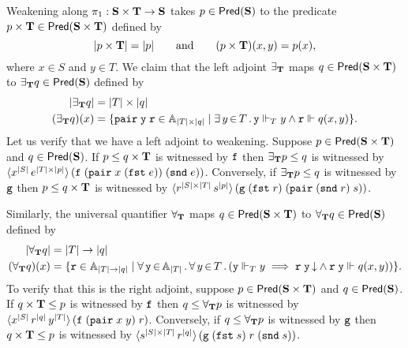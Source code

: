 Weakening along $\pi_1 : \mathbf{S} \times \mathbf{T} \to \mathbf{S}$ takes $p
\in \mathsf{Pred}(\mathbf{S})$ to the predicate $p \times \mathbf{T} \in
\mathsf{Pred}(\mathbf{S} \times \mathbf{T})$ defined by
%
\begin{equation*}
  |p \times \mathbf{T}| = |p|
  \qquad\text{and}\qquad
  (p \times \mathbf{T})(x,y) = p(x),
\end{equation*}
%
where $x \in S$ and $y \in T$. We claim that the left adjoint
$\exists_{\mathbf{T}}$ maps $q \in \mathsf{Pred}(\mathbf{S} \times \mathbf{T})$ to
$\exists_{\mathbf{T}} q \in \mathsf{Pred}(\mathbf{S})$ defined by
%
\begin{align*}
  |\exists_{\mathbf{T}} q| &= |T| \times |q| \\
  (\exists_{\mathbf{T}} q)(x) &=
  \{ \mathtt{pair}\;\mathtt{y}\;\mathtt{r} \in \mathbb{A}_{|T| \times |q|} \mid
    \exists\, y \,{\in}\, T\,.\,\mathtt{y} \Vdash_T y \land \mathtt{r} \Vdash q(x,y)
  \}.
\end{align*}
%
Let us verify that we have a left adjoint to weakening. Suppose $p \in
\mathsf{Pred}(\mathbf{S} \times \mathbf{T})$ and $q \in \mathsf{Pred}(\mathbf{S})$. If $p \leq
q \times \mathbf{T}$ is witnessed by $\mathtt{f}$ then $\exists_{\mathbf{T}} p
\leq q$ is witnessed by $\langle x^{|S|} \, e^{|T| \times
    |p|} \rangle\,(\mathtt{f}\; (\mathtt{pair} \; x \; (\mathtt{fst}\; e)) \; (\mathtt{snd} \; e))$.
Conversely, if $\exists_{\mathbf{T}} p \leq q$ is witnessed by $\mathtt{g}$
then $p \leq q \times \mathbf{T}$ is witnessed by $\langle r^{|S|
    \times |T|} \, s^{|p|} \rangle\,(\mathtt{g} \;
  (\mathtt{fst}\;r)\; (\mathtt{pair} \; (\mathtt{snd} \; r) \; s))$.

Similarly, the universal quantifier $\forall_{\mathbf{T}}$ maps $q \in
\mathsf{Pred}(\mathbf{S} \times \mathbf{T})$ to $\forall_{\mathbf{T}} q \in
\mathsf{Pred}(\mathbf{S})$ defined by
%
\begin{align*}
  |\forall_{\asm{T}} q| &= |T| \to |q| \\
  (\forall_{\asm{T}} q)(x) &=
  \set{ \R{r} \in \Atyp{|T| \to |q|} \such
    \xall{\R{y}}{\Atyp{|T|}}{
      \all{y}{T}{
        \R{y} \rz_T y \implies
        \defined{\R{r}\;\R{y}} \land
        \R{r}\;\R{y} \rz q(x,y)
      }
    }
  }.
\end{align*}
%
To verify that this is the right adjoint, suppose $p \in \mathsf{Pred}(\mathbf{S}
  \times \mathbf{T})$ and $q \in \mathsf{Pred}(\mathbf{S})$. If $q \times \mathbf{T}
\leq p$ is witnessed by $\mathtt{f}$ then $q \leq \forall_{\mathbf{T}} p$ is
witnessed by $\langle x^{|S|} \, r^{|q|} \,
  y^{|T|} \rangle\,(\mathtt{f} \; (\mathtt{pair} \; x \; y) \; r)$. Conversely,
if $q \leq \forall_{\mathbf{T}} p$ is witnessed by $\mathtt{g}$ then $q \times
\mathbf{T} \leq p$ is witnessed by $\langle s^{|S| \times |T|} \,
  r^{|q|} \rangle\,(\mathtt{g} \; (\mathtt{fst} \; s) \; r \; (\mathtt{snd} \; s))$.

